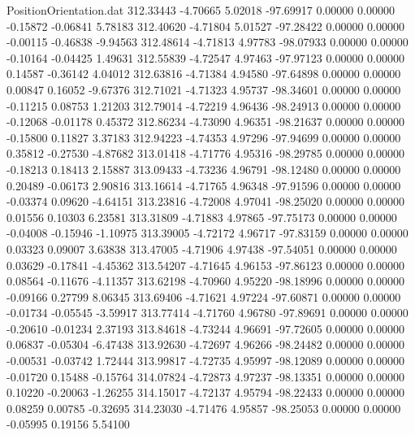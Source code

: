 \begin{filecontents}{PositionOrientation.dat}
 312.33443   -4.70665    5.02018   -97.69917    0.00000    0.00000   -0.15872   -0.06841    5.78183
 312.40620   -4.71804    5.01527   -97.28422    0.00000    0.00000   -0.00115   -0.46838   -9.94563
 312.48614   -4.71813    4.97783   -98.07933    0.00000    0.00000   -0.10164   -0.04425    1.49631
 312.55839   -4.72547    4.97463   -97.97123    0.00000    0.00000    0.14587   -0.36142    4.04012
 312.63816   -4.71384    4.94580   -97.64898    0.00000    0.00000    0.00847    0.16052   -9.67376
 312.71021   -4.71323    4.95737   -98.34601    0.00000    0.00000   -0.11215    0.08753    1.21203
 312.79014   -4.72219    4.96436   -98.24913    0.00000    0.00000   -0.12068   -0.01178    0.45372
 312.86234   -4.73090    4.96351   -98.21637    0.00000    0.00000   -0.15800    0.11827    3.37183
 312.94223   -4.74353    4.97296   -97.94699    0.00000    0.00000    0.35812   -0.27530   -4.87682
 313.01418   -4.71776    4.95316   -98.29785    0.00000    0.00000   -0.18213    0.18413    2.15887
 313.09433   -4.73236    4.96791   -98.12480    0.00000    0.00000    0.20489   -0.06173    2.90816
 313.16614   -4.71765    4.96348   -97.91596    0.00000    0.00000   -0.03374    0.09620   -4.64151
 313.23816   -4.72008    4.97041   -98.25020    0.00000    0.00000    0.01556    0.10303    6.23581
 313.31809   -4.71883    4.97865   -97.75173    0.00000    0.00000   -0.04008   -0.15946   -1.10975
 313.39005   -4.72172    4.96717   -97.83159    0.00000    0.00000    0.03323    0.09007    3.63838
 313.47005   -4.71906    4.97438   -97.54051    0.00000    0.00000    0.03629   -0.17841   -4.45362
 313.54207   -4.71645    4.96153   -97.86123    0.00000    0.00000    0.08564   -0.11676   -4.11357
 313.62198   -4.70960    4.95220   -98.18996    0.00000    0.00000   -0.09166    0.27799    8.06345
 313.69406   -4.71621    4.97224   -97.60871    0.00000    0.00000   -0.01734   -0.05545   -3.59917
 313.77414   -4.71760    4.96780   -97.89691    0.00000    0.00000   -0.20610   -0.01234    2.37193
 313.84618   -4.73244    4.96691   -97.72605    0.00000    0.00000    0.06837   -0.05304   -6.47438
 313.92630   -4.72697    4.96266   -98.24482    0.00000    0.00000   -0.00531   -0.03742    1.72444
 313.99817   -4.72735    4.95997   -98.12089    0.00000    0.00000   -0.01720    0.15488   -0.15764
 314.07824   -4.72873    4.97237   -98.13351    0.00000    0.00000    0.10220   -0.20063   -1.26255
 314.15017   -4.72137    4.95794   -98.22433    0.00000    0.00000    0.08259    0.00785   -0.32695
 314.23030   -4.71476    4.95857   -98.25053    0.00000    0.00000   -0.05995    0.19156    5.54100

\end{filecontents}
